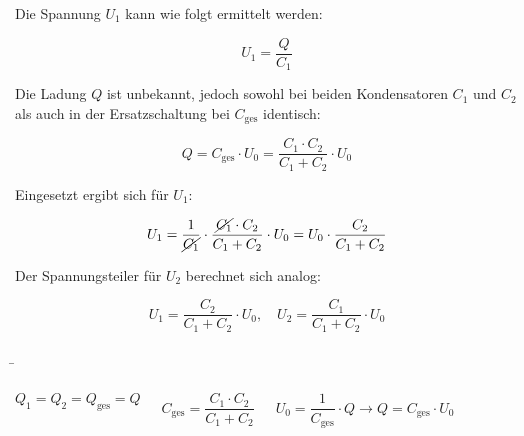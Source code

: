 \begin{frame}
{		Die Spannung $U_1$ kann wie folgt ermittelt werden:

		\begin{equation*}
			U_1 = \frac{Q}{C_1} 
		\end{equation*}

		Die Ladung $Q$ ist unbekannt, jedoch sowohl bei beiden Kondensatoren $C_1$ und $C_2$ als auch in der Ersatzschaltung 
		bei $C_\mathrm{ges}$ identisch: 
		
		\begin{equation*}
			Q = C_\mathrm{ges} \cdot U_0 = \frac{C_1 \cdot C_2}{C_1 + C_2} \cdot U_0
		\end{equation*}

		Eingesetzt ergibt sich für $U_1$:

		\begin{equation*}
			U_1 = \frac{1}{\cancel{C_1}} \cdot \frac{\cancel{C_1} \cdot C_2}{C_1 + C_2} \cdot U_0 = U_0 \cdot \frac{C_2}{C_1 + C_2}
		\end{equation*}


		Der Spannungsteiler für $U_2$ berechnet sich analog:

		\begin{Merksatz}{}
			\begin{equation*}
			U_1 = \frac{C_2}{C_1 + C_2} \cdot U_0, \quad U_2 = \frac{C_1}{C_1 + C_2} \cdot U_0
		\end{equation*}
		\end{Merksatz}


	}

	\b{


    \begin{columns}
        \vspace*{-80pt}



		
		\begin{equation*}
			Q_1 = Q_2 = Q_\mathrm{ges} = Q
		\end{equation*}
		
		\vspace*{-5pt}

		\begin{equation*}
			C_\mathrm{ges} = \frac{C_1 \cdot C_2}{C_1 + C_2}
		\end{equation*}

		\vspace*{-10pt}

		\begin{equation*}
			U_0= \frac{1}{C_\mathrm{ges}} \cdot Q \rightarrow Q = C_\mathrm{ges} \cdot U_0
		\end{equation*}


\end{columns}}
\end{frame}
